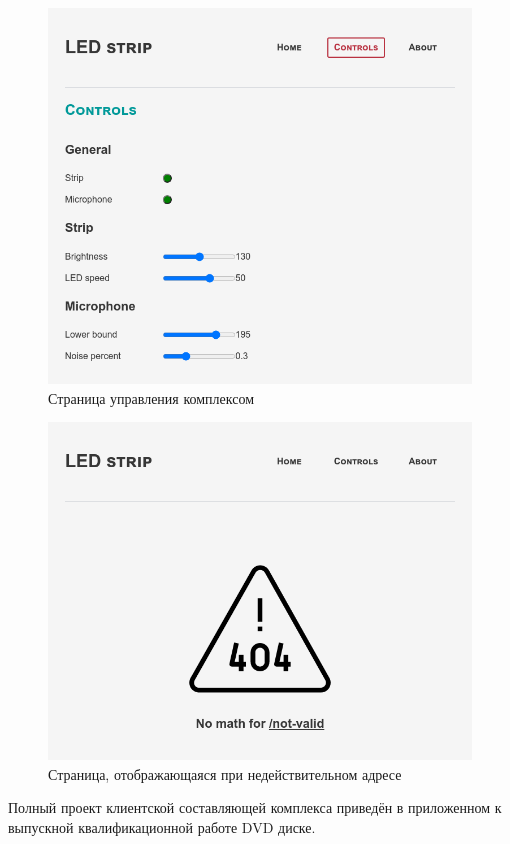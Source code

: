 \begin{figure}[H]
  \centering
  \includegraphics[height=0.4\textheight]{assets/images/practical/site__controls.png}
  \caption{Страница управления комплексом}
  \label{img:site__controls}
\end{figure}

\begin{figure}[H]
  \centering
  \includegraphics[height=0.4\textheight]{assets/images/practical/site__not-valid.png}
  \caption{Страница, отображающаяся при недействительном адресе}
  \label{img:site__not-valid}
\end{figure}

Полный проект клиентской составляющей комплекса приведён в приложенном к выпускной квалификационной работе DVD диске.

